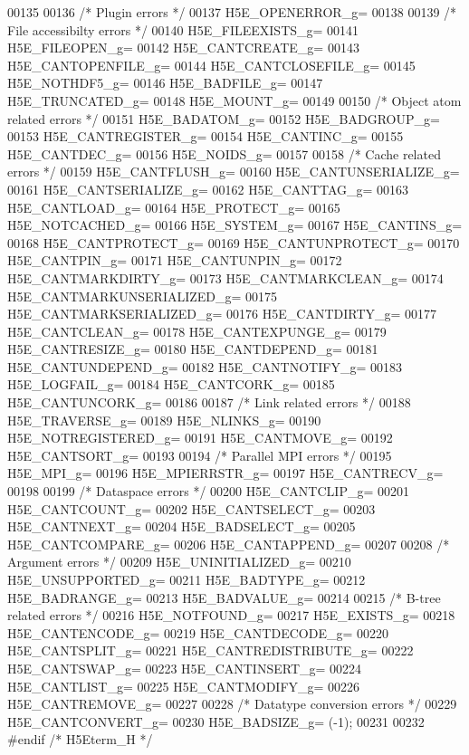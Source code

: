 \begin{DoxyCode}
00135 
00136 \textcolor{comment}{/* Plugin errors */}    
00137 H5E\_OPENERROR\_g=
00138 
00139 \textcolor{comment}{/* File accessibilty errors */}    
00140 H5E\_FILEEXISTS\_g=    
00141 H5E\_FILEOPEN\_g=    
00142 H5E\_CANTCREATE\_g=    
00143 H5E\_CANTOPENFILE\_g=    
00144 H5E\_CANTCLOSEFILE\_g=    
00145 H5E\_NOTHDF5\_g=    
00146 H5E\_BADFILE\_g=    
00147 H5E\_TRUNCATED\_g=    
00148 H5E\_MOUNT\_g=
00149 
00150 \textcolor{comment}{/* Object atom related errors */}    
00151 H5E\_BADATOM\_g=    
00152 H5E\_BADGROUP\_g=    
00153 H5E\_CANTREGISTER\_g=    
00154 H5E\_CANTINC\_g=    
00155 H5E\_CANTDEC\_g=    
00156 H5E\_NOIDS\_g=
00157 
00158 \textcolor{comment}{/* Cache related errors */}    
00159 H5E\_CANTFLUSH\_g=    
00160 H5E\_CANTUNSERIALIZE\_g=    
00161 H5E\_CANTSERIALIZE\_g=    
00162 H5E\_CANTTAG\_g=    
00163 H5E\_CANTLOAD\_g=    
00164 H5E\_PROTECT\_g=    
00165 H5E\_NOTCACHED\_g=    
00166 H5E\_SYSTEM\_g=    
00167 H5E\_CANTINS\_g=    
00168 H5E\_CANTPROTECT\_g=    
00169 H5E\_CANTUNPROTECT\_g=    
00170 H5E\_CANTPIN\_g=    
00171 H5E\_CANTUNPIN\_g=    
00172 H5E\_CANTMARKDIRTY\_g=    
00173 H5E\_CANTMARKCLEAN\_g=    
00174 H5E\_CANTMARKUNSERIALIZED\_g=    
00175 H5E\_CANTMARKSERIALIZED\_g=    
00176 H5E\_CANTDIRTY\_g=    
00177 H5E\_CANTCLEAN\_g=    
00178 H5E\_CANTEXPUNGE\_g=    
00179 H5E\_CANTRESIZE\_g=    
00180 H5E\_CANTDEPEND\_g=    
00181 H5E\_CANTUNDEPEND\_g=    
00182 H5E\_CANTNOTIFY\_g=    
00183 H5E\_LOGFAIL\_g=    
00184 H5E\_CANTCORK\_g=    
00185 H5E\_CANTUNCORK\_g=
00186 
00187 \textcolor{comment}{/* Link related errors */}    
00188 H5E\_TRAVERSE\_g=    
00189 H5E\_NLINKS\_g=    
00190 H5E\_NOTREGISTERED\_g=    
00191 H5E\_CANTMOVE\_g=    
00192 H5E\_CANTSORT\_g=
00193 
00194 \textcolor{comment}{/* Parallel MPI errors */}    
00195 H5E\_MPI\_g=    
00196 H5E\_MPIERRSTR\_g=    
00197 H5E\_CANTRECV\_g=
00198 
00199 \textcolor{comment}{/* Dataspace errors */}    
00200 H5E\_CANTCLIP\_g=    
00201 H5E\_CANTCOUNT\_g=    
00202 H5E\_CANTSELECT\_g=    
00203 H5E\_CANTNEXT\_g=    
00204 H5E\_BADSELECT\_g=    
00205 H5E\_CANTCOMPARE\_g=    
00206 H5E\_CANTAPPEND\_g=
00207 
00208 \textcolor{comment}{/* Argument errors */}    
00209 H5E\_UNINITIALIZED\_g=    
00210 H5E\_UNSUPPORTED\_g=    
00211 H5E\_BADTYPE\_g=    
00212 H5E\_BADRANGE\_g=    
00213 H5E\_BADVALUE\_g=
00214 
00215 \textcolor{comment}{/* B-tree related errors */}    
00216 H5E\_NOTFOUND\_g=    
00217 H5E\_EXISTS\_g=    
00218 H5E\_CANTENCODE\_g=    
00219 H5E\_CANTDECODE\_g=    
00220 H5E\_CANTSPLIT\_g=    
00221 H5E\_CANTREDISTRIBUTE\_g=    
00222 H5E\_CANTSWAP\_g=    
00223 H5E\_CANTINSERT\_g=    
00224 H5E\_CANTLIST\_g=    
00225 H5E\_CANTMODIFY\_g=    
00226 H5E\_CANTREMOVE\_g=
00227 
00228 \textcolor{comment}{/* Datatype conversion errors */}    
00229 H5E\_CANTCONVERT\_g=    
00230 H5E\_BADSIZE\_g= (-1);
00231 
00232 \textcolor{preprocessor}{#endif }\textcolor{comment}{/* H5Eterm\_H */}\textcolor{preprocessor}{}
\end{DoxyCode}
